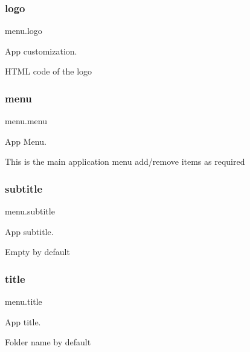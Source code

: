 \subsubsection{\texorpdfstring{logo}{logo}}
{\footnotesize\ttfamily menu.\+logo}



App customization. 

H\+T\+ML code of the logo \mbox{\label{namespacemenu_ab310d6d9e1c5996d8b28b9e6896e8b22}} 
\subsubsection{\texorpdfstring{menu}{menu}}
{\footnotesize\ttfamily menu.\+menu}



App Menu. 

This is the main application menu add/remove items as required \mbox{\label{namespacemenu_a440d776515ac077840e8d9389c071b98}} 
\subsubsection{\texorpdfstring{subtitle}{subtitle}}
{\footnotesize\ttfamily menu.\+subtitle}



App subtitle. 

Empty by default \mbox{\label{namespacemenu_ab998e7dc6cc33b3fe815797c6134b042}} 
\subsubsection{\texorpdfstring{title}{title}}
{\footnotesize\ttfamily menu.\+title}



App title. 

Folder name by default 